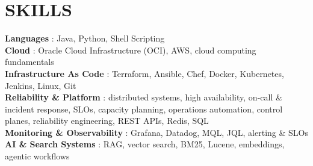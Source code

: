 \documentclass[letterpaper,11pt]{article}
\begin{document}
\section{SKILLS}
\begin{itemize}[leftmargin=0in, label={}]
    \small{\item{
     \textbf{Languages} {: Java, Python, Shell Scripting} \\
     \textbf{Cloud} {: Oracle Cloud Infrastructure (OCI), AWS, cloud computing fundamentals} \\
     \textbf{Infrastructure As Code} {: Terraform, Ansible, Chef, Docker, Kubernetes, Jenkins, Linux, Git} \\
     \textbf{Reliability \& Platform} {: distributed systems, high availability, on-call \& incident response, SLOs, capacity planning, operations automation, control planes, reliability engineering, REST APIs, Redis, SQL} \\
     \textbf{Monitoring \& Observability} {: Grafana, Datadog, MQL, JQL, alerting \& SLOs} \\
     \textbf{AI \& Search Systems} {: RAG, vector search, BM25, Lucene, embeddings, agentic workflows}
    }}
\end{itemize}

\end{document}

